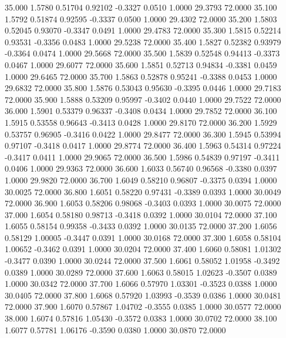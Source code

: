   35.000   1.5780   0.51704   0.92102  -0.3327   0.0510   1.0000  29.3793  72.0000
  35.100   1.5792   0.51874   0.92595  -0.3337   0.0500   1.0000  29.4302  72.0000
  35.200   1.5803   0.52045   0.93070  -0.3347   0.0491   1.0000  29.4783  72.0000
  35.300   1.5815   0.52214   0.93531  -0.3356   0.0483   1.0000  29.5238  72.0000
  35.400   1.5827   0.52382   0.93979  -0.3364   0.0474   1.0000  29.5668  72.0000
  35.500   1.5839   0.52548   0.94413  -0.3373   0.0467   1.0000  29.6077  72.0000
  35.600   1.5851   0.52713   0.94834  -0.3381   0.0459   1.0000  29.6465  72.0000
  35.700   1.5863   0.52878   0.95241  -0.3388   0.0453   1.0000  29.6832  72.0000
  35.800   1.5876   0.53043   0.95630  -0.3395   0.0446   1.0000  29.7183  72.0000
  35.900   1.5888   0.53209   0.95997  -0.3402   0.0440   1.0000  29.7522  72.0000
  36.000   1.5901   0.53379   0.96337  -0.3408   0.0434   1.0000  29.7852  72.0000
  36.100   1.5915   0.53558   0.96643  -0.3413   0.0428   1.0000  29.8170  72.0000
  36.200   1.5929   0.53757   0.96905  -0.3416   0.0422   1.0000  29.8477  72.0000
  36.300   1.5945   0.53994   0.97107  -0.3418   0.0417   1.0000  29.8774  72.0000
  36.400   1.5963   0.54314   0.97224  -0.3417   0.0411   1.0000  29.9065  72.0000
  36.500   1.5986   0.54839   0.97197  -0.3411   0.0406   1.0000  29.9363  72.0000
  36.600   1.6033   0.56740   0.96568  -0.3380   0.0397   1.0000  29.9820  72.0000
  36.700   1.6049   0.58210   0.96807  -0.3375   0.0394   1.0000  30.0025  72.0000
  36.800   1.6051   0.58220   0.97431  -0.3389   0.0393   1.0000  30.0049  72.0000
  36.900   1.6053   0.58206   0.98068  -0.3403   0.0393   1.0000  30.0075  72.0000
  37.000   1.6054   0.58180   0.98713  -0.3418   0.0392   1.0000  30.0104  72.0000
  37.100   1.6055   0.58154   0.99358  -0.3433   0.0392   1.0000  30.0135  72.0000
  37.200   1.6056   0.58129   1.00005  -0.3447   0.0391   1.0000  30.0168  72.0000
  37.300   1.6058   0.58104   1.00652  -0.3462   0.0391   1.0000  30.0204  72.0000
  37.400   1.6060   0.58081   1.01302  -0.3477   0.0390   1.0000  30.0244  72.0000
  37.500   1.6061   0.58052   1.01958  -0.3492   0.0389   1.0000  30.0289  72.0000
  37.600   1.6063   0.58015   1.02623  -0.3507   0.0389   1.0000  30.0342  72.0000
  37.700   1.6066   0.57970   1.03301  -0.3523   0.0388   1.0000  30.0405  72.0000
  37.800   1.6068   0.57920   1.03993  -0.3539   0.0386   1.0000  30.0481  72.0000
  37.900   1.6070   0.57867   1.04702  -0.3555   0.0385   1.0000  30.0577  72.0000
  38.000   1.6074   0.57816   1.05430  -0.3572   0.0383   1.0000  30.0702  72.0000
  38.100   1.6077   0.57781   1.06176  -0.3590   0.0380   1.0000  30.0870  72.0000
